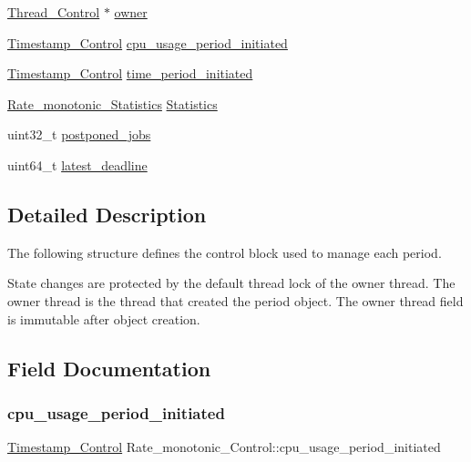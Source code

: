 \begin{DoxyCompactItemize}
\mbox{\hyperlink{struct__Thread__Control}{Thread\+\_\+\+Control}} $\ast$ \mbox{\hyperlink{structRate__monotonic__Control_ad6d997fcb87f49af5896722a34da7244}{owner}}
\item 
\mbox{\hyperlink{group__SuperCoreTimeStamp_ga8508036506d5211c98844c88045e2410}{Timestamp\+\_\+\+Control}} \mbox{\hyperlink{structRate__monotonic__Control_a295f830e730f8c548a743596dbdb308e}{cpu\+\_\+usage\+\_\+period\+\_\+initiated}}
\item 
\mbox{\hyperlink{group__SuperCoreTimeStamp_ga8508036506d5211c98844c88045e2410}{Timestamp\+\_\+\+Control}} \mbox{\hyperlink{structRate__monotonic__Control_a3157757fefd869eae191df4b9c77507e}{time\+\_\+period\+\_\+initiated}}
\item 
\mbox{\hyperlink{structRate__monotonic__Statistics}{Rate\+\_\+monotonic\+\_\+\+Statistics}} \mbox{\hyperlink{structRate__monotonic__Control_a4857637dc9ed13112fff9aaae0114ea0}{Statistics}}
\item 
uint32\+\_\+t \mbox{\hyperlink{structRate__monotonic__Control_a96732887b5cce6f60f55431666e46288}{postponed\+\_\+jobs}}
\item 
uint64\+\_\+t \mbox{\hyperlink{structRate__monotonic__Control_af8d39ea22c9c2a17d0362cc2f054b6b6}{latest\+\_\+deadline}}
\end{DoxyCompactItemize}


\subsection{Detailed Description}
The following structure defines the control block used to manage each period. 

State changes are protected by the default thread lock of the owner thread. The owner thread is the thread that created the period object. The owner thread field is immutable after object creation. 

\subsection{Field Documentation}
\mbox{\label{structRate__monotonic__Control_a295f830e730f8c548a743596dbdb308e}} 
\subsubsection{\texorpdfstring{cpu\_usage\_period\_initiated}{cpu\_usage\_period\_initiated}}
{\footnotesize\ttfamily \mbox{\hyperlink{group__SuperCoreTimeStamp_ga8508036506d5211c98844c88045e2410}{Timestamp\+\_\+\+Control}} Rate\+\_\+monotonic\+\_\+\+Control\+::cpu\+\_\+usage\+\_\+period\+\_\+initiated}

